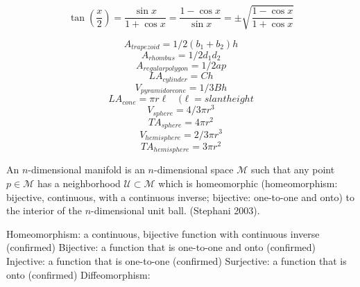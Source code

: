 \documentclass[10pt]{article}
\begin{document}
\[
  \tan \left( \frac{x}{2} \right) = \frac{\sin x}{1 + \cos x}
                                  = \frac{1 - \cos x}{\sin x}
                                  = \pm \sqrt{ \frac{1-\cos x}{1+\cos x} }
\]

\[
A_{trapezoid} = 1/2 ( b_1 + b_2 ) h
\]
\[
A_{rhombus} = 1/2 d_1 d_2
\]
\[
A_{regular polygon} = 1/2 a p
\]
\[
LA_{cylinder} = C h
\]
\[
V_{pyramid or cone} = 1/3 B h
\]
\[
LA_{cone} = \pi r \ell \quad (\ell = slant height
\]
\[
V_{sphere} = 4/3 \pi r^3
\]
\[
TA_{sphere} = 4 \pi r^2
\]
\[
V_{hemisphere} = 2/3 \pi r^3
\]
\[
TA_{hemisphere} = 3 \pi r^2
\]
\newpage
\null
\scriptsize

An $n$-dimensional manifold is an $n$-dimensional space ${\mathcal M}$ such that any 
point $p \in {\mathcal M}$ has a neighborhood ${\mathcal U} \subset {\mathcal M}$ which
is homeomorphic (homeomorphism: bijective, continuous, with a continuous inverse; bijective: one-to-one and onto) 
to the interior of the $n$-dimensional unit ball. (Stephani 2003).

Homeomorphism: a continuous, bijective function with continuous inverse (confirmed)
Bijective: a function that is one-to-one and onto (confirmed)
Injective: a function that is one-to-one (confirmed)
Surjective: a function that is onto (confirmed)
Diffeomorphism: 
\end{document}
